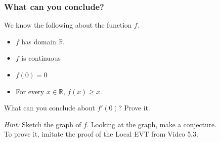 \documentclass[14pt]{beamer}
\begin{document}
	\begin{frame}[t]
		\frametitle{What can you conclude?}

		We know the following about the function $f$.
		\begin{itemize}
			\item $f$ has domain $\mathbb{R}$.

			\item $f$ is continuous

			\item $f(0)=0$

			\item For every $x \in \mathbb{R}$, $f(x) \geq x$.
		\end{itemize}
		\begin{block}{}
			What can you conclude about $f'(0)$? Prove it.
		\end{block}

		\vfill

		\emph{Hint:} Sketch the graph of $f$. Looking at the graph, make a
		conjecture. \\ To prove it, imitate the proof of the Local EVT from Video
		5.3.
	\end{frame}
\end{document}
